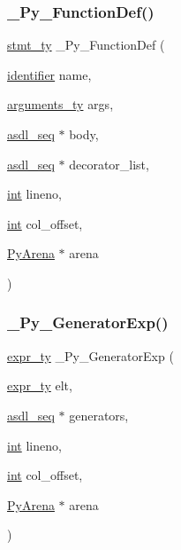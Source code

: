 \subsubsection{\texorpdfstring{\_Py\_FunctionDef()}{\_Py\_FunctionDef()}}
{\footnotesize\ttfamily \mbox{\hyperlink{_python-ast_8h_a39618071027b661bc03e8916e664e1a7}{stmt\+\_\+ty}} \+\_\+\+Py\+\_\+\+Function\+Def (\begin{DoxyParamCaption}\item[{\mbox{\hyperlink{asdl_8h_a78ca2081e230a95abc88c411c9816775}{identifier}}}]{name,  }\item[{\mbox{\hyperlink{_python-ast_8h_a45cc6e94d598fdc335d8c85739108a3e}{arguments\+\_\+ty}}}]{args,  }\item[{\mbox{\hyperlink{structasdl__seq}{asdl\+\_\+seq}} $\ast$}]{body,  }\item[{\mbox{\hyperlink{structasdl__seq}{asdl\+\_\+seq}} $\ast$}]{decorator\+\_\+list,  }\item[{\mbox{\hyperlink{warnings_8h_a74f207b5aa4ba51c3a2ad59b219a423b}{int}}}]{lineno,  }\item[{\mbox{\hyperlink{warnings_8h_a74f207b5aa4ba51c3a2ad59b219a423b}{int}}}]{col\+\_\+offset,  }\item[{\mbox{\hyperlink{pyarena_8h_a9edeb357fbb27333471022a0975adb7a}{Py\+Arena}} $\ast$}]{arena }\end{DoxyParamCaption})}

\mbox{\label{_python-ast_8h_a2e8fb0398e6235d848e31d61b4f34289}} 
\subsubsection{\texorpdfstring{\_Py\_GeneratorExp()}{\_Py\_GeneratorExp()}}
{\footnotesize\ttfamily \mbox{\hyperlink{_python-ast_8h_a56d3705e020a071405094a220c4592bd}{expr\+\_\+ty}} \+\_\+\+Py\+\_\+\+Generator\+Exp (\begin{DoxyParamCaption}\item[{\mbox{\hyperlink{_python-ast_8h_a56d3705e020a071405094a220c4592bd}{expr\+\_\+ty}}}]{elt,  }\item[{\mbox{\hyperlink{structasdl__seq}{asdl\+\_\+seq}} $\ast$}]{generators,  }\item[{\mbox{\hyperlink{warnings_8h_a74f207b5aa4ba51c3a2ad59b219a423b}{int}}}]{lineno,  }\item[{\mbox{\hyperlink{warnings_8h_a74f207b5aa4ba51c3a2ad59b219a423b}{int}}}]{col\+\_\+offset,  }\item[{\mbox{\hyperlink{pyarena_8h_a9edeb357fbb27333471022a0975adb7a}{Py\+Arena}} $\ast$}]{arena }\end{DoxyParamCaption})}

